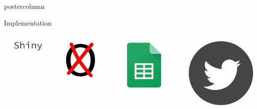 \documentclass[final,hyperref={pdfpagelabels=false}]{beamer}
\newcommand*\circled[1]{\tikz[baseline=(char.base)]{
\node[shape=circle,draw,inner sep=2pt] (char) {#1};}}
\begin{document}
\begin{frame}
\begin{columns}
\begin{column}{1\textwidth}
\begin{columns}[T]
\begin{column}{.484\textwidth}
\begin{beamercolorbox}[center,wd=\textwidth]{postercolumn}
\begin{minipage}[T]{.95\textwidth}
\begin{block}{\footnotesize \circled{3} Implementation}
\begin{columns}[t]
  \hspace{-1.5ex}
  \textcolor{LMUlightgray}{\vrule{}}
  \hspace{1.5ex}

  \begin{column}{.15\textwidth}
  \begin{center}\centering
  \vspace{1ex}
  \includegraphics[height=3ex]{figures/implementation_shiny}
  \end{center}
  \end{column}

  \hspace{-1.5ex}
  \textcolor{LMUlightgray}{\vrule{}}
  \hspace{1.5ex}

  \begin{column}{.15\textwidth}
  \begin{center}\centering
  \includegraphics[height=5ex]{figures/hexSticker_icon}
  \end{center}
  \end{column}

  \hspace{-1.5ex}
  \textcolor{LMUlightgray}{\vrule{}}
  \hspace{1.5ex}

  \begin{column}{.15\textwidth}
  \begin{center}\centering
  \includegraphics[height=5ex]{figures/implementation_sheets}
  \end{center}
  \end{column}

  \hspace{-1.5ex}
  \textcolor{LMUlightgray}{\vrule{}}
  \hspace{1.5ex}

  \begin{column}{.15\textwidth}
  \begin{center}\centering
  \includegraphics[height=5ex]{figures/implementation_twitter}
  \end{center}
  \end{column}
\end{columns}
\end{block}


\end{minipage}
\end{beamercolorbox}
\end{column}
\end{columns}
\end{column}
\end{columns}
\end{frame}
\end{document}
